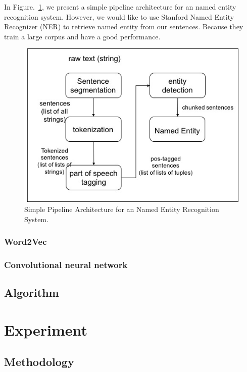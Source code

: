 \documentclass[10pt,twocolumn,letterpaper]{article}
\begin{document}
In Figure.~\ref{fig:pipeline}, we present a simple pipeline architecture for an named entity recognition system. However, we would like to use Stanford Named Entity Recognizer (NER) to retrieve named entity from our sentences. Because they train a large corpus and have a good performance.
\begin{figure}
\includegraphics[width=\linewidth]{pipeline}
\caption{Simple Pipeline Architecture for an Named Entity Recognition System. }
\label{fig:pipeline}
\end{figure}

\subsubsection{Word2Vec}

\subsubsection{Convolutional neural network}




\subsection{Algorithm}



\section{Experiment}
\subsection{Methodology}
\end{document}
